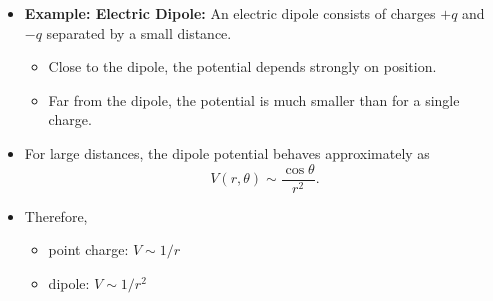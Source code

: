 \documentclass[t,aspectratio=169]{beamer}
\begin{document}
\begin{frame}
\begin{itemize}
\pagebreak
\item \textbf{Example: Electric Dipole:} An electric dipole consists of charges $+q$ and $-q$ separated by a small distance.
\begin{itemize}
\item Close to the dipole, the potential depends strongly on position.
\item Far from the dipole, the potential is much smaller than for a single charge.
\end{itemize}
\item For large distances, the dipole potential behaves approximately as
$$ V(r,\theta) \sim \frac{\cos\theta}{r^2}. $$
\item Therefore,
\begin{itemize}
\item point charge: $V \sim 1/r$
\item dipole: $V \sim 1/r^2$
\end{itemize}

\end{itemize}
\end{frame}


\end{document}
